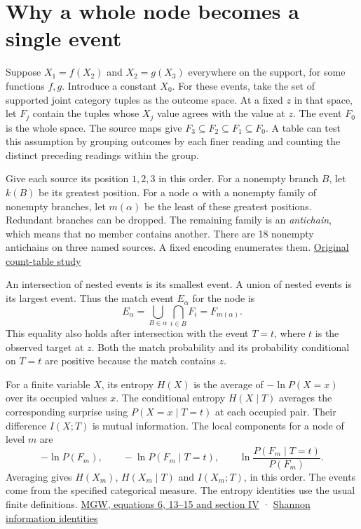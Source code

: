 \clearpage

\section{Why a whole node becomes a single event}\label{why-a-whole-node-becomes-a-single-event}

Suppose \(X_1=f(X_2)\) and \(X_2=g(X_3)\) everywhere on the support, for some functions \(f,g\). Introduce a constant \(X_0\). For these events, take the set of supported joint category tuples as the outcome space. At a fixed \(z\) in that space, let \(F_j\) contain the tuples whose \(X_j\) value agrees with the value at \(z\). The event \(F_0\) is the whole space. The source maps give \(F_3\subseteq F_2\subseteq F_1\subseteq F_0\). A table can test this assumption by grouping outcomes by each finer reading and counting the distinct preceding readings within the group.

Give each source its position \(1,2,3\) in this order. For a nonempty branch \(B\), let \(k(B)\) be its greatest position. For a node \(\alpha\) with a nonempty family of nonempty branches, let \(m(\alpha)\) be the least of these greatest positions. Redundant branches can be dropped. The remaining family is an \emph{antichain}, which means that no member contains another. There are 18 nonempty antichains on three named sources. A fixed encoding enumerates them. \href{https://github.com/sepahead/pid-rs/blob/main/audit/research/three-source-six-certificate-observations/README.md}{Original count-table study}

An intersection of nested events is its smallest event. A union of nested events is its largest event. Thus the match event \(E_\alpha\) for the node is \[
E_\alpha=\bigcup_{B\in\alpha}\bigcap_{i\in B}F_i=F_{m(\alpha)}.
\] This equality also holds after intersection with the event \(T=t\), where \(t\) is the observed target at \(z\). Both the match probability and its probability conditional on \(T=t\) are positive because the match contains \(z\).

For a finite variable \(X\), its entropy \(H(X)\) is the average of \(-\ln P(X=x)\) over its occupied values \(x\). The conditional entropy \(H(X\mid T)\) averages the corresponding surprise using \(P(X=x\mid T=t)\) at each occupied pair. Their difference \(I(X;T)\) is mutual information. The local components for a node of level \(m\) are \[
-\ln P(F_m),\qquad -\ln P(F_m\mid T=t),\qquad
\ln\frac{P(F_m\mid T=t)}{P(F_m)}.
\] Averaging gives \(H(X_m)\), \(H(X_m\mid T)\) and \(I(X_m;T)\), in this order. The events come from the specified categorical measure. The entropy identities use the usual finite definitions. \href{https://arxiv.org/abs/2002.03356v5}{MGW, equations 6, 13--15 and section IV} · \href{https://doi.org/10.1002/047174882X}{Shannon information identities}

